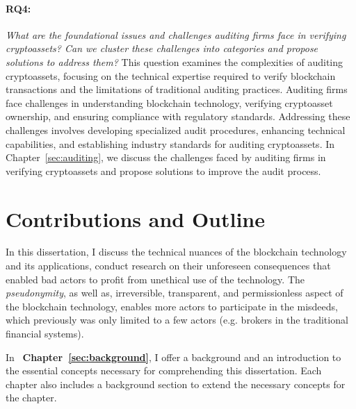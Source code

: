 \paragraph{RQ4:} \textit{What are the foundational issues and challenges auditing firms face in verifying cryptoassets? Can we cluster these challenges into categories and propose solutions to address them?}
This question examines the complexities of auditing cryptoassets, focusing on the technical expertise required to verify blockchain transactions and the limitations of traditional auditing practices. Auditing firms face challenges in understanding blockchain technology, verifying cryptoasset ownership, and ensuring compliance with regulatory standards. Addressing these challenges involves developing specialized audit procedures, enhancing technical capabilities, and establishing industry standards for auditing cryptoassets. In Chapter~\ref{sec:auditing}, we discuss the challenges faced by auditing firms in verifying cryptoassets and propose solutions to improve the audit process.



\section{Contributions and Outline} 

In this dissertation, I discuss the technical nuances of the blockchain technology and its applications, conduct research on their unforeseen consequences that enabled bad actors to profit from unethical use of the technology. The \textit{pseudonymity}, as well as, irreversible, transparent, and permissionless aspect of the blockchain technology, enables more actors to participate in the misdeeds, which previously was only limited to a few actors (e.g. brokers in the traditional financial systems).

In ~\textbf{Chapter~\ref{sec:background}}, I offer a background and an introduction to the essential concepts necessary for comprehending this dissertation. Each chapter also includes a background section to extend the necessary concepts for the chapter.


